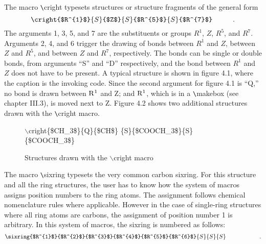  The macro \verb+\+cright typesets structures or structure 
 fragments of the general form
 \[ \cright{$R^{1}$}{S}{$Z$}{S}{$R^{5}$}{S}{$R^{7}$} \hspace{1cm}
    \mbox{.} \]
 The arguments 1, 3, 5, and 7 are the substituents or groups
 $R^{1}$, $Z$, $R^{5}$, and $R^{7}$. Arguments 2, 4, and 6 trigger
 the drawing of bonds between $R^{1}$ and $Z$, between $Z$ and $R^{5}$,
 and between $Z$ and $R^{7}$, respectively. The bonds can be single
 or double bonds, from arguments ``S'' and ``D'' respectively, 
 and the bond between $R^{1}$ and $Z$ does not have to be present.
 A typical structure is shown in figure 4.1, where the caption
 is the invoking code. Since the second argument for figure 4.1
 is ``Q,'' no bond is drawn between ${\rm R^{1}}$ and Z; and
 ${\rm R^{1}}$, which is in a \verb+\+makebox (see chapter III.3),
 is moved next to Z. Figure 4.2 shows two additional structures
 drawn with the \verb+\+cright macro.
 
 \begin{figure}[h]\centering
  \caption{$\backslash $cright\{\$CH\_3\$\}\{Q\}\{\$CH\$\}
     \{S\}\{\$COOCH\_3\$\}\{S\}\{\$COOCH\_3\$\}   }
  \end{figure}
 
 
 \begin{figure}[h]                %
  \hspace{3cm}
  \hspace{3cm}
  \caption{Structures drawn with the $\backslash $cright macro}
 \end{figure}

 The macro \verb+\+sixring typesets the very common carbon sixring.
 For this structure and all the ring structures, the user has to
 know how the system of macros assigns position numbers to the
 ring atoms. The assignment follows chemical nomenclature rules
 where applicable. However in the case of single-ring structures
 where all ring atoms are carbons,
 the assignment of position
 number 1 is arbitrary. In this system of macros, the sixring is 
 numbered as follows: \\
 \[ \sixring{$R^{1}$}{$R^{2}$}{$R^{3}$}{$R^{4}$}{$R^{5}$}{$R^{6}$}
    {S}{S}{S} \hspace{2cm}  \mbox{.}  \]



